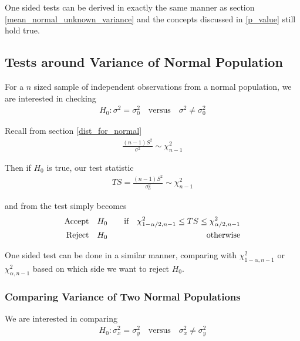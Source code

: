 \documentclass[../probability-notes.tex]{subfiles}
\begin{document}
    One sided tests can be derived in exactly the same manner as section \ref{mean_normal_unknown_variance} and the concepts discussed in \ref{p_value} still hold true.


    \subsection{Tests around Variance of Normal Population}
    For a $n$ sized sample of independent observations from a normal population, we are interested in checking
    \begin{align*}
        H_{0}: \sigma^{2} = \sigma_{0}^{2} \quad \text{versus} \quad \sigma^{2} \neq \sigma_{0}^{2}
    \end{align*}

    Recall from section \ref{dist_for_normal}
    \begin{align*}
        \frac{(n-1)S^{2}}{\sigma^{2}} \sim \chi_{n-1}^{2}
    \end{align*}

    Then if $H_{0}$ is true, our test statistic
    \begin{align*}
        TS = \frac{(n-1)S^{2}}{\sigma_{0}^{2}} \sim \chi_{n-1}^{2}
    \end{align*}

    and from the test simply becomes
    \begin{alignat*}{2}
        \text{Accept\quad} &H_{0} \quad &\text{if} \quad \chi_{1-\alpha/2, n-1}^{2} \leq TS \leq \chi_{\alpha/2, n-1}^{2}\\
        \text{Reject\quad} &H_{0} \quad &\text{otherwise}
    \end{alignat*}

    One sided test can be done in a similar manner, comparing with $\chi_{1-\alpha, n-1}^{2}$ or $\chi_{\alpha, n-1}^{2}$ based on which side we want to reject $H_{0}$.\newline

    \subsubsection{Comparing Variance of Two Normal Populations}
    We are interested in comparing
    \begin{align*}
        H_{0}: \sigma_{x}^{2} = \sigma_{y}^{2} \quad \text{versus} \quad \sigma_{x}^{2} \neq \sigma_{y}^{2}
    \end{align*}
\end{document}
